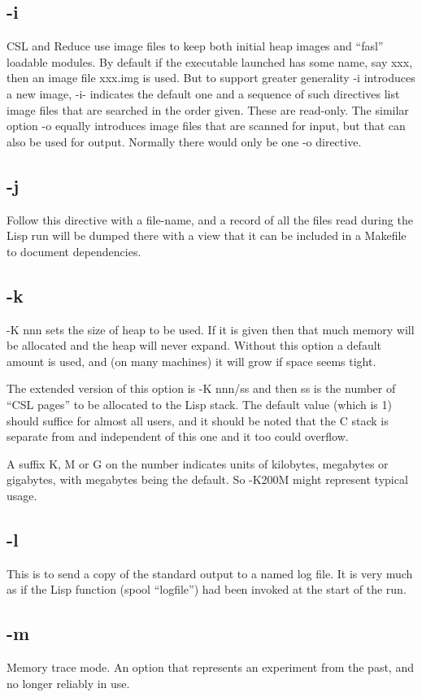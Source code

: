 \documentclass[a4paper,11pt]{article}
\begin{document}
\subsection{\ttfamily -i}
CSL and Reduce use image files to keep both initial heap images and
``fasl'' loadable modules. By default if the executable launched has some name,
say xxx, then an image file xxx.img is used. But to support greater
generality {\ttfamily -i} introduces a new image, {\ttfamily -i-} indicates
the default one and a sequence of such directives list image files that are
searched in the order given. These are read-only. The similar option
{\ttfamily -o} equally introduces image files that are scanned for input, but
that can also be used for output. Normally there would only be one
{\ttfamily -o} directive.
\subsection{\ttfamily -j}
Follow this directive with a file-name, and a record of all the files read
during the Lisp run will be dumped there with a view that it can be included
in a Makefile to document dependencies.
\subsection{\ttfamily -k}
{\ttfamily -K nnn} sets the size of heap to be used.  If it is given then that much
memory will be allocated and the heap will never expand.  Without this
option a default amount is used, and (on many machines) it will grow
if space seems tight.

The extended version of this option is {\ttfamily -K nnn/ss} and then ss is the
number of ``CSL pages'' to be allocated to the Lisp stack. The default
value (which is 1) should suffice for almost all users, and it should
be noted that the C stack is separate from and independent of this one and
it too could overflow.

A suffix K, M or G on the number indicates units of kilobytes, megabytes or
gigabytes, with megabytes being the default. So {\ttfamily -K200M} might
represent typical usage.
\subsection{\ttfamily -l}
This is to send a copy of the standard output to a named log file. It is
very much as if the Lisp function {\ttfamily (spool ``logfile'')} had been
invoked at the start of the run.
\subsection{\ttfamily -m}
Memory trace mode. An option that represents an experiment from the past,
and no longer reliably in use.
\end{document}
